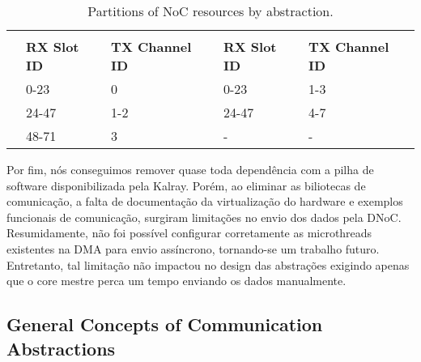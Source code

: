 			\begin{table}[!tb]
				\centering%
				\caption{Partitions of NoC resources by abstraction.}%
				\label{tab.noc-resources}%


				\begin{tabular}{l|l|l|l|l|}
					\cline{2-5}
															& \multicolumn{2}{c|}{\textbf{\cnoc}}          & \multicolumn{2}{c|}{\textbf{\dnoc}}          \\ \cline{2-5}
															& \textbf{RX Slot ID} & \textbf{TX Channel ID} & \textbf{RX Slot ID} & \textbf{TX Channel ID} \\ \hline
					\multicolumn{1}{|l|}{\textbf{\mailbox}} & 0-23                & 0                      & 0-23                & 1-3                    \\ \hline
					\multicolumn{1}{|l|}{\textbf{\portal}}  & 24-47               & 1-2                    & 24-47               & 4-7                    \\ \hline
					\multicolumn{1}{|l|}{\textbf{\sync}}    & 48-71               & 3                      & -                   & -                      \\ \hline
				\end{tabular}

			\end{table}

			Por fim, nós conseguimos remover quase toda dependência com a pilha de software disponibilizada pela Kalray.
			Porém, ao eliminar as biliotecas de comunicação, a falta de documentação da virtualização do hardware e exemplos funcionais de comunicação, surgiram limitações no envio dos dados pela DNoC.
			Resumidamente, não foi possível configurar corretamente as microthreads existentes na DMA para envio assíncrono, tornando-se um trabalho futuro.
			Entretanto, tal limitação não impactou no design das abstrações exigindo apenas que o core mestre perca um tempo enviando os dados manualmente.

		\subsection{General Concepts of Communication Abstractions}
		\label{sec.general-concepts}


